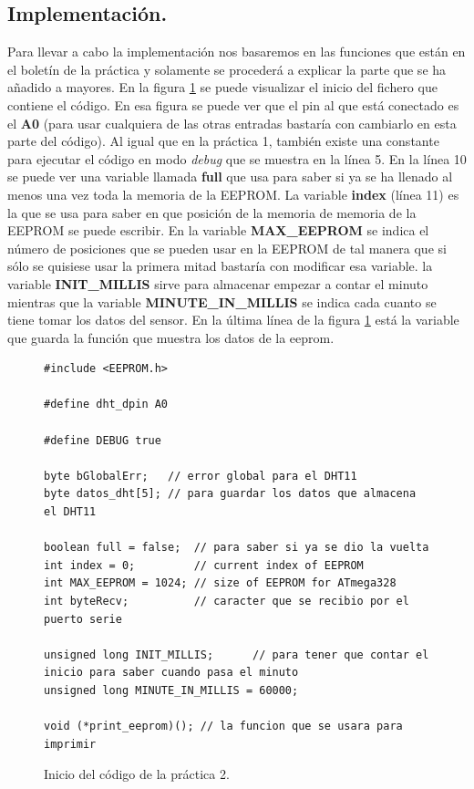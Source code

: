 \documentclass{article}
\begin{document}
\subsection{Implementación.}

	Para llevar a cabo la implementación nos basaremos en las funciones que están en el boletín de la práctica y solamente se procederá a explicar la parte que se ha añadido a mayores. En la figura \ref{cod:p2:init} se puede visualizar el inicio del fichero que contiene el código. En esa figura se puede ver que el pin al que está conectado es el \textbf{A0} (para usar cualquiera de las otras entradas bastaría con cambiarlo en esta parte del código). Al igual que en la práctica 1, también existe una constante para ejecutar el código en modo \textit{debug} que se muestra en la línea 5. En la línea 10 se puede ver una variable llamada \textbf{full} que usa para saber si ya se ha llenado al menos una vez toda la memoria de la EEPROM. La variable \textbf{index} (línea 11) es la que se usa para saber en que posición de la memoria de memoria de la EEPROM se puede escribir. En la variable \textbf{MAX\_EEPROM} se indica el número de posiciones que se pueden usar en la EEPROM de tal manera que si sólo se quisiese usar la primera mitad bastaría con modificar esa variable. la variable \textbf{INIT\_MILLIS} sirve para almacenar empezar a contar el minuto mientras que la variable \textbf{MINUTE\_IN\_MILLIS} se indica cada cuanto se tiene tomar los datos del sensor. En la última línea de la figura \ref{cod:p2:init} está la variable que guarda la función que muestra los datos de la eeprom.

\begin{figure}[h]
	\begin{lstlisting}[style=c]
#include <EEPROM.h>

#define dht_dpin A0

#define DEBUG true

byte bGlobalErr;   // error global para el DHT11
byte datos_dht[5]; // para guardar los datos que almacena el DHT11

boolean full = false;  // para saber si ya se dio la vuelta
int index = 0;         // current index of EEPROM
int MAX_EEPROM = 1024; // size of EEPROM for ATmega328
int byteRecv;          // caracter que se recibio por el puerto serie

unsigned long INIT_MILLIS;      // para tener que contar el inicio para saber cuando pasa el minuto
unsigned long MINUTE_IN_MILLIS = 60000;

void (*print_eeprom)(); // la funcion que se usara para imprimir
	\end{lstlisting}
	\caption{Inicio del código de la práctica 2.}
	\label{cod:p2:init}
\end{figure}
\end{document}
